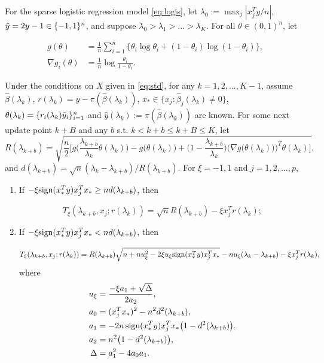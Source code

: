 \begin{theorem}
For the sparse logistic regression model \eqref{eq:logis}, let $\lambda_0:=\max_j|x_j^Ty/n|$, $\Tilde{y}=2y-1\in\{-1,1\}^n$, and suppose $\lambda_0>\lambda_1>...>\lambda_K$. For all $\theta\in(0,1)^n$, let 

\begin{equation}
    \begin{split}
        g(\theta)&=\frac{1}{n}\sum_{i=1}^n\{\theta_i\log \theta_i+(1-\theta_i)\log(1-\theta_i)\},\\
    \nabla g_i(\theta) &= \frac{1}{n}\log\frac{\theta_i}{1-\theta_i}.
    \end{split}
\end{equation}

Under the conditions on $X$ given in \eqref{eq:std}, for any $k=1,2,...,K-1$, assume $\hat{\beta}(\lambda_k)$, $r(\lambda_k)=y-\pi(\hat{\beta}(\lambda_k))$, $x_*\in\{x_j:\hat{\beta}_j(\lambda_k)\neq0\} $, $\theta(\lambda_k)=\{r_i(\lambda_k)\Tilde{y}_i\}_{i=1}^n$ and $\hat{y}(\lambda_k):=\pi(\hat{\beta}(\lambda_k))$ are known. For some next update point $k+B$ and any $b$ s.t. $k<k+b\leq k+B\leq K$, let
\begin{equation}
  R(\lambda_{k+b}) = \sqrt{\frac{n}{2} \bigg[g\bigg(\frac{\lambda_{k+b}}{\lambda_k}\theta(\lambda_k)\bigg) - g\bigg(\theta(\lambda_k)\bigg) + \bigg(1 - \frac{\lambda_{k+b}}{\lambda_k}\bigg) \bigg(\nabla g\big(\theta(\lambda_k)\big)\bigg)^T\theta(\lambda_k)\bigg]},
\end{equation}
and $d(\lambda_{k+b})=\sqrt{n}(\lambda_k-\lambda_{k+b})/R(\lambda_{k+b})$. For $\xi = -1,1$ and $j=1,2,...,p$,

\begin{enumerate}
    \item If $-\xi \textrm{sign}(x_*^Ty)x_j^Tx_*\geq nd(\lambda_{k+b})$, then
    
    \begin{equation}
        T_\xi(\lambda_{k+b},x_j;r(\lambda_k))=\sqrt{n}R(\lambda_{k+b})-\xi x_j^Tr(\lambda_k);
    \end{equation}
    
    \item If $-\xi \textrm{sign}(x_*^Ty)x_j^Tx_*< nd(\lambda_{k+b})$, then
    
    \begin{equation}
        T_\xi(\lambda_{k+b},x_j;r(\lambda_k))=R(\lambda_{k+b})\sqrt{n+nu_\xi^2-2\xi u_\xi \textrm{sign}(x_*^Ty)x_j^Tx_*}-nu_\xi(\lambda_k-\lambda_{k+b})-\xi x_j^Tr(\lambda_k),
    \end{equation}
    where
    \begin{align}
        u_\xi&=\frac{-\xi a_1+\sqrt{\Delta}}{2a_2},\\
        a_0&=(x_j^Tx_*)^2-n^2d^2(\lambda_{k+b}),\nonumber\\
        a_1&=-2n\,\textrm{sign}(x_*^Ty)x_j^Tx_*\big(1-d^2(\lambda_{k+b})\big),\nonumber\\
        a_2&=n^2\big(1-d^2(\lambda_{k+b})\big),\nonumber\\
        \Delta&=a_1^2-4a_0a_1.\nonumber
    \end{align}
\end{enumerate}


\end{theorem}

